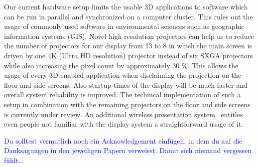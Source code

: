 \documentclass[twocolumn]{svjour3}          %
\newcommand{\myedit}[2]{\textcolor{red}{\st{#1}} \textcolor{blue}{#2}}
\begin{document}
Our current hardware setup limits the usable 3D applications to software which can be run in parallel and synchronized on a computer cluster. This rules out the usage of commonly used software in environmental sciences such as geographic information systems (GIS). Novel high resolution projectors can help us to reduce the number of projectors for our display from 13 to 8 in which the main screen is driven by one 4K (Ultra HD resolution) projector instead of six SXGA projectors while also increasing the pixel count by approximately 30 \%. This allows the usage of every 3D enabled application when disclaiming the projection on the floor and side screens. Also startup times of the display will be much faster and overall system reliability is improved. The technical implementation of such a setup in combination with the remaining projectors on the floor and side screens is currently under review. An additional wireless presentation system~\cite{web:clickshare} entitles even people not familiar with the display system a straightforward usage of it.

\bigskip
\myedit{}{Du solltest vermutlich noch ein Acknowledgement einf\"ugen, in dem du auf die Danksagungen in den jeweiligen Papern verweisst. Damit sich niemand vergessen f\"uhlt\dots}




\end{document}
